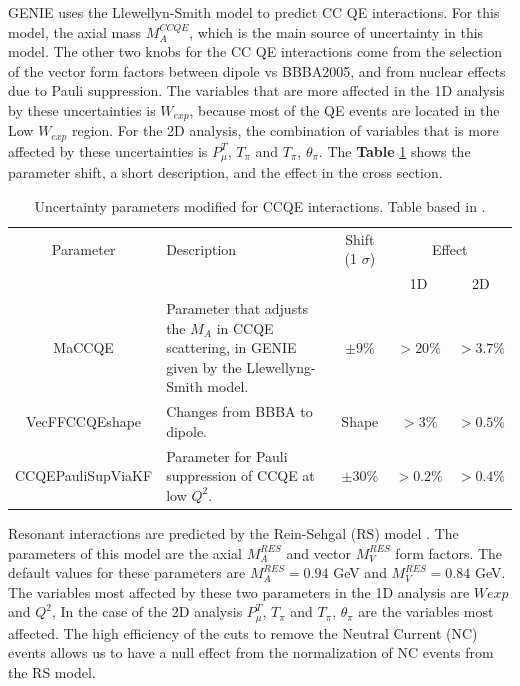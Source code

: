 GENIE uses the Llewellyn-Smith model to predict CC QE interactions. For this model, the axial mass $M^{CCQE}_A$, which is the main source of uncertainty in this model. The other two knobs for the CC QE interactions come from the selection of the vector form factors between dipole vs BBBA2005, and from nuclear effects due to Pauli suppression. The variables that are more affected in the 1D analysis by these uncertainties is $W_{exp}$, because most of the QE events are located in the Low $W_{exp}$ region. For the 2D analysis, the combination of variables that is more affected by these uncertainties is $P^T_\mu$, $T_\pi$ and $T_\pi$, $\theta_\pi$. The \textbf{Table} \ref{tab:ErrorAnalysis:SystematicUnc:GenieCCQEmodels} shows the parameter shift, a short description, and the effect in the cross section. 
 
\begin{table}[!htb]
    \centering
    \begin{tabular}{c|p{1.5in}|c|c|c}
        \hline 
        Parameter & Description  & Shift (1 $\sigma$) & \multicolumn{2}{c}{Effect} \\
         & & & 1D & 2D \\
        \hline  
        MaCCQE & Parameter that adjusts the $M_A$ in CCQE scattering, in GENIE given by the Llewellyng-Smith model. & $\pm9\%$ & $>20\%$ & $>3.7\%$ \\ \hline
        VecFFCCQEshape & Changes from BBBA to dipole. & Shape & $>3\%$ & $>0.5\%$ \\
        \hline
        CCQEPauliSupViaKF & Parameter for Pauli suppression of CCQE at low $Q^2$. &$\pm30\%$ & $>0.2\%$ & $>0.4\%$ \\ \hline
        
    \end{tabular}
    \caption{Uncertainty parameters modified for CCQE interactions. Table based in \cite{GENIEUnc}.}
    \label{tab:ErrorAnalysis:SystematicUnc:GenieCCQEmodels}
\end{table}

Resonant interactions are predicted by the Rein-Sehgal (RS) model \cite{REIN198179}. The parameters of this model are the axial $M^{RES}_A$ and vector $M^{RES}_V$ form factors. The default values for these parameters are $M^{RES}_A=0.94$ GeV and $M^{RES}_V =0.84$ GeV. The variables most affected by these two parameters in the 1D analysis are $W{exp}$ and $Q^2$, In the case of the 2D analysis $P^T_\mu$, $T_\pi$ and $T_\pi$, $\theta_\pi$ are the variables most affected. The high efficiency of the cuts to remove the Neutral Current (NC) events allows us to have a null effect from the normalization of NC events from the RS model.

